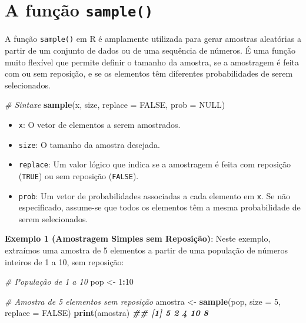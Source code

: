 \documentclass[
]{book}
\newenvironment{Shaded}{\begin{snugshade}}{\end{snugshade}}
\newcommand{\AttributeTok}[1]{\textcolor[rgb]{0.13,0.29,0.53}{#1}}
\newcommand{\CommentTok}[1]{\textcolor[rgb]{0.56,0.35,0.01}{\textit{#1}}}
\newcommand{\ConstantTok}[1]{\textcolor[rgb]{0.56,0.35,0.01}{#1}}
\newcommand{\DecValTok}[1]{\textcolor[rgb]{0.00,0.00,0.81}{#1}}
\newcommand{\DocumentationTok}[1]{\textcolor[rgb]{0.56,0.35,0.01}{\textbf{\textit{#1}}}}
\newcommand{\FunctionTok}[1]{\textcolor[rgb]{0.13,0.29,0.53}{\textbf{#1}}}
\newcommand{\NormalTok}[1]{#1}
\newcommand{\OtherTok}[1]{\textcolor[rgb]{0.56,0.35,0.01}{#1}}
\newcommand{\SpecialCharTok}[1]{\textcolor[rgb]{0.81,0.36,0.00}{\textbf{#1}}}
\providecommand{\tightlist}{%
  \setlength{\itemsep}{0pt}\setlength{\parskip}{0pt}}
\begin{document}
\section{\texorpdfstring{A função \texttt{sample()}}{A função sample()}}\label{a-funuxe7uxe3o-sample}

A função \texttt{sample()} em R é amplamente utilizada para gerar amostras
aleatórias a partir de um conjunto de dados ou de uma sequência de
números. É uma função muito flexível que permite definir o tamanho da
amostra, se a amostragem é feita com ou sem reposição, e se os elementos
têm diferentes probabilidades de serem selecionados.

\begin{Shaded}
\begin{Highlighting}[]
\CommentTok{\# Sintaxe}
\FunctionTok{sample}\NormalTok{(x, size, }\AttributeTok{replace =} \ConstantTok{FALSE}\NormalTok{, }\AttributeTok{prob =} \ConstantTok{NULL}\NormalTok{)}
\end{Highlighting}
\end{Shaded}

\begin{itemize}
\tightlist
\item
  \texttt{x}: O vetor de elementos a serem amostrados.
\item
  \texttt{size}: O tamanho da amostra desejada.
\item
  \texttt{replace}: Um valor lógico que indica se a amostragem é feita com
  reposição (\texttt{TRUE}) ou sem reposição (\texttt{FALSE}).
\item
  \texttt{prob}: Um vetor de probabilidades associadas a cada elemento em
  \texttt{x}. Se não especificado, assume-se que todos os elementos têm a
  mesma probabilidade de serem selecionados.
\end{itemize}

\textbf{Exemplo 1 (Amostragem Simples sem Reposição)}: Neste exemplo,
extraímos uma amostra de 5 elementos a partir de uma população de
números inteiros de 1 a 10, sem reposição:

\begin{Shaded}
\begin{Highlighting}[]
\CommentTok{\# População de 1 a 10}
\NormalTok{pop }\OtherTok{\textless{}{-}} \DecValTok{1}\SpecialCharTok{:}\DecValTok{10}

\CommentTok{\# Amostra de 5 elementos sem reposição}
\NormalTok{amostra }\OtherTok{\textless{}{-}} \FunctionTok{sample}\NormalTok{(pop, }\AttributeTok{size =} \DecValTok{5}\NormalTok{, }\AttributeTok{replace =} \ConstantTok{FALSE}\NormalTok{)}
\FunctionTok{print}\NormalTok{(amostra)}
\DocumentationTok{\#\# [1]  5  2  4 10  8}
\end{Highlighting}
\end{Shaded}
\end{document}
